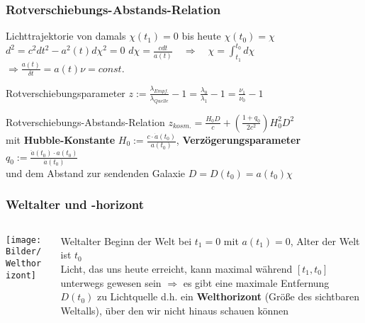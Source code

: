 \documentclass{beamer}
\begin{document}
\begin{frame}\frametitle{Rotverschiebungs-Abstands-Relation}

\begin{block}{Lichttrajektorie von damals $\chi(t_1) = 0$ bis heute $\chi(t_0) = \chi$}
$d^2 = c^2 dt^2 - a^2(t) d\chi^2 = 0$
$d\chi = \frac{c dt}{a(t)} \quad \Rightarrow \quad \chi = \displaystyle \int_{t_1}^{t_0} d\chi$\\
$\Rightarrow \frac{a(t)}{\delta t} = a(t) \nu = const.$
\end{block}

\begin{block}{Rotverschiebungsparameter}
$z := \frac{\lambda_{Empf.}}{\lambda_{Quelle}} - 1 = \frac{\lambda_0}{\lambda_1} - 1 = \frac{\nu_1}{\nu_0} - 1$
\end{block}

\tiny

\begin{block}{Rotverschiebungs-Abstands-Relation}
$z_{kosm.} = \frac{H_0 D}{c} + (\frac{1+q_0}{2c^2}) H_0^2 D^2$\\
mit \textbf{Hubble-Konstante} $H_0 := \frac{c \cdot \dot{a}(t_0)}{a(t_0)}$, \textbf{Verzögerungsparameter} $q_0 := \frac{\ddot{a}(t_0) \cdot a(t_0)}{\dot{a}(t_0)}$\\ und dem Abstand zur sendenden Galaxie $D = D(t_0) = a(t_0) \chi$
\end{block}

\end{frame}

\begin{frame}\frametitle{Weltalter und -horizont}

\begin{columns}

\begin{column}{.48\textwidth}

\texttt{[image: Bilder/Welthorizont]}

\end{column}

\hfill

\begin{column}{.48\textwidth}

\begin{block}{Weltalter}
Beginn der Welt bei $t_1=0$ mit $a(t_1) = 0$, Alter der Welt ist $t_0$\\
Licht, das uns heute erreicht, kann maximal während $[t_1,t_0]$ unterwegs gewesen sein $\Rightarrow$ es gibt eine maximale Entfernung $D(t_0)$ zu Lichtquelle d.h. ein \textbf{Welthorizont} (Größe des sichtbaren Weltalls), über den wir nicht hinaus schauen können
\end{block}

\end{column}

\end{columns}

\end{frame}
\end{document}
